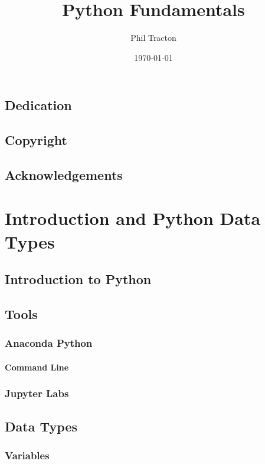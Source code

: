 \documentclass{book}
\title {Python Fundamentals}
\author{Phil Tracton}
\date{\today}
\begin{document}
\maketitle
\frontmatter

\chapter{Dedication}
\chapter{Copyright}
\chapter{Acknowledgements}

\tableofcontents
\listoffigures
\listoftables
\listoflistings %

\part{Introduction and Python Data Types}

\chapter{Introduction to Python}

\chapter{Tools}

\section{Anaconda Python}
\subsection{Command Line}
\section{Jupyter Labs}

\chapter{Data Types}

\section{Variables}
\end{document}
